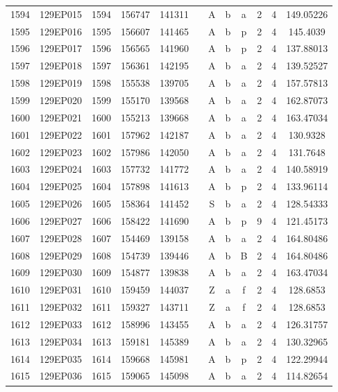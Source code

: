 \begin{tabular}{|*{12}{c|}}
1594 & 129EP015 & 1594 & 156747 & 141311 &  & A & b & a & 2 & 4 & 149.05226 \\ 
1595 & 129EP016 & 1595 & 156607 & 141465 &  & A & b & p & 2 & 4 & 145.4039 \\ 
1596 & 129EP017 & 1596 & 156565 & 141960 &  & A & b & p & 2 & 4 & 137.88013 \\ 
1597 & 129EP018 & 1597 & 156361 & 142195 &  & A & b & a & 2 & 4 & 139.52527 \\ 
1598 & 129EP019 & 1598 & 155538 & 139705 &  & A & b & a & 2 & 4 & 157.57813 \\ 
1599 & 129EP020 & 1599 & 155170 & 139568 &  & A & b & a & 2 & 4 & 162.87073 \\ 
1600 & 129EP021 & 1600 & 155213 & 139668 &  & A & b & a & 2 & 4 & 163.47034 \\ 
1601 & 129EP022 & 1601 & 157962 & 142187 &  & A & b & a & 2 & 4 & 130.9328 \\ 
1602 & 129EP023 & 1602 & 157986 & 142050 &  & A & b & a & 2 & 4 & 131.7648 \\ 
1603 & 129EP024 & 1603 & 157732 & 141772 &  & A & b & a & 2 & 4 & 140.58919 \\ 
1604 & 129EP025 & 1604 & 157898 & 141613 &  & A & b & p & 2 & 4 & 133.96114 \\ 
1605 & 129EP026 & 1605 & 158364 & 141452 &  & S & b & a & 2 & 4 & 128.54333 \\ 
1606 & 129EP027 & 1606 & 158422 & 141690 &  & A & b & p & 9 & 4 & 121.45173 \\ 
1607 & 129EP028 & 1607 & 154469 & 139158 &  & A & b & a & 2 & 4 & 164.80486 \\ 
1608 & 129EP029 & 1608 & 154739 & 139446 &  & A & b & B & 2 & 4 & 164.80486 \\ 
1609 & 129EP030 & 1609 & 154877 & 139838 &  & A & b & a & 2 & 4 & 163.47034 \\ 
1610 & 129EP031 & 1610 & 159459 & 144037 &  & Z & a & f & 2 & 4 & 128.6853 \\ 
1611 & 129EP032 & 1611 & 159327 & 143711 &  & Z & a & f & 2 & 4 & 128.6853 \\ 
1612 & 129EP033 & 1612 & 158996 & 143455 &  & A & b & a & 2 & 4 & 126.31757 \\ 
1613 & 129EP034 & 1613 & 159181 & 145389 &  & A & b & a & 2 & 4 & 130.32965 \\ 
1614 & 129EP035 & 1614 & 159668 & 145981 &  & A & b & p & 2 & 4 & 122.29944 \\ 
1615 & 129EP036 & 1615 & 159065 & 145098 &  & A & b & a & 2 & 4 & 114.82654 \\ 

\end{tabular}

